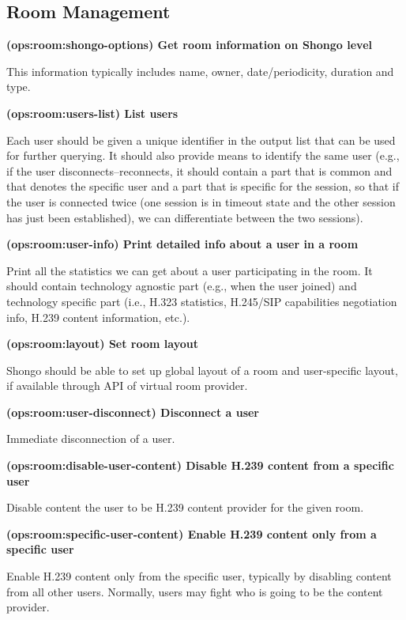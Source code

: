 \documentclass[a4paper]{report}
\makeatletter
\newcounter{UCcounter}
\newenvironment{UseCases}%
	{\begin{list}{\textbf{UC-\arabic{UCcounter}}}{\@nmbrlisttrue\def\@listctr{UCcounter}}}%
	{\end{list}}
\newcommand{\UClabel}[1]{\label{UC:#1}}
\newcommand{\UseCase}[2]{\item\UClabel{#2} \textbf{(#2) #1}\\ \nopagebreak}
\makeatother
\begin{document}
\subsection{Room Management}

\begin{UseCases}

\UseCase{Get room information on Shongo level}{ops:room:shongo-options}

This information typically includes name, owner, date/periodicity, duration and type.


\UseCase{List users}{ops:room:users-list}

Each user should be given a unique identifier in the output list that can be
used for further querying. It should also provide means to identify the same
user (e.g., if the user disconnects--reconnects, it should contain a part that
is common and that denotes the specific user and a part that is specific for
the session, so that if the user is connected twice (one session is in timeout
state and the other session has just been established), we can differentiate
between the two sessions).

\UseCase{Print detailed info about a user in a room}{ops:room:user-info}

Print all the statistics we can get about a user participating in the room. It
should contain technology agnostic part (e.g., when the user joined) and
technology specific part (i.e., H.323 statistics, H.245/SIP capabilities
negotiation info, H.239 content information, etc.).

\UseCase{Set room layout}{ops:room:layout}

Shongo should be able to set up global layout of a room and user-specific
layout, if available through API of virtual room provider.

\UseCase{Disconnect a user}{ops:room:user-disconnect}

Immediate disconnection of a user.

\UseCase{Disable H.239 content from a specific user}{ops:room:disable-user-content}

Disable content the user to be H.239 content provider for the given room. 

\UseCase{Enable H.239 content only from a specific user}{ops:room:specific-user-content}

Enable H.239 content only from the specific user, typically by disabling
content from all other users. Normally, users may fight who is going to be the
content provider.


\end{UseCases}
\end{document}
